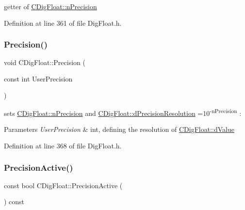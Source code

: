 getter of \hyperlink{classCDigFloat_ad580654be35246d14c91482581c0bc11}{C\+Dig\+Float\+::n\+Precision} 



Definition at line 361 of file Dig\+Float.\+h.

\mbox{\label{classCDigFloat_a6d12203e256d0fba602b3cfec37f96a6}} 
\subsubsection{\texorpdfstring{Precision()}{Precision()}\hspace{0.1cm}{\footnotesize\ttfamily [2/2]}}
{\footnotesize\ttfamily void C\+Dig\+Float\+::\+Precision (\begin{DoxyParamCaption}\item[{const int}]{User\+Precision }\end{DoxyParamCaption})\hspace{0.3cm}{\ttfamily [inline]}}



sets \hyperlink{classCDigFloat_ad580654be35246d14c91482581c0bc11}{C\+Dig\+Float\+::n\+Precision} and \hyperlink{classCDigFloat_a7f9809fa0b25da57f5c8c18a02b7d1a7}{C\+Dig\+Float\+::d\+Precision\+Resolution} =10\textsuperscript{-\/n\+Precision} \+: 


\begin{DoxyParams}{Parameters}
{\em User\+Precision} & int, defining the resolution of \hyperlink{classCDigFloat_a4bbe69e30dd4e20527362493aa9aaf96}{C\+Dig\+Float\+::d\+Value} \\
\hline
\end{DoxyParams}


Definition at line 368 of file Dig\+Float.\+h.

\mbox{\label{classCDigFloat_a4d6ca24beda280be719374c2a6b2c64d}} 
\subsubsection{\texorpdfstring{Precision\+Active()}{PrecisionActive()}\hspace{0.1cm}{\footnotesize\ttfamily [1/2]}}
{\footnotesize\ttfamily const bool C\+Dig\+Float\+::\+Precision\+Active (\begin{DoxyParamCaption}{ }\end{DoxyParamCaption}) const\hspace{0.3cm}{\ttfamily [inline]}}



